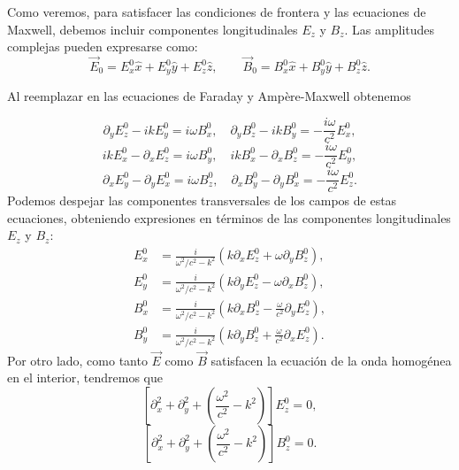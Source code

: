 Como veremos, para satisfacer las condiciones de frontera y las ecuaciones de Maxwell, debemos incluir componentes longitudinales $E_z$ y $B_z$. 
Las amplitudes complejas pueden expresarse como:
\begin{equation}
\vec{E}_0 = E^0_x \hat{x} + E^0_y \hat{y} + E^0_z \hat{z},
\qquad
\vec{B}_0 = B^0_x \hat{x} + B^0_y \hat{y} + B^0_z \hat{z}.
\end{equation}

Al reemplazar en las ecuaciones de Faraday y Ampère-Maxwell obtenemos


\begin{equation}
    \partial_y E^0_z - ik E^0_y = i\omega B^0_x, \quad
    \partial_y B^0_z - ik B^0_y = -\frac{i\omega}{c^2} E^0_x,
\end{equation}
\begin{equation}
    ik E^0_x - \partial_x E^0_z = i\omega B^0_y, \quad
    ik B^0_x - \partial_x B^0_z = -\frac{i\omega}{c^2} E^0_y,
\end{equation}
\begin{equation}
    \partial_x E^0_y - \partial_y E^0_x = i\omega B^0_z, \quad
    \partial_x B^0_y - \partial_y B^0_x = -\frac{i\omega}{c^2} E^0_z.
\end{equation}
Podemos despejar las componentes transversales de los campos de estas ecuaciones, obteniendo expresiones en términos de las componentes longitudinales $E_z$ y $B_z$:
\begin{align}
    E^0_x &= \frac{i}{\omega^2/c^2 - k^2} \left( k \partial_x E^0_z + \omega \partial_y B^0_z \right), \label{ExGO}\\
    E^0_y &= \frac{i}{\omega^2/c^2 - k^2} \left( k \partial_y E^0_z - \omega \partial_x B^0_z \right), \label{EyGO}\\
    B^0_x &= \frac{i}{\omega^2/c^2 - k^2} \left( k \partial_x B^0_z - \frac{\omega}{c^2} \partial_y E^0_z \right), \label{BxGO}\\
    B^0_y &= \frac{i}{\omega^2/c^2 - k^2} \left( k \partial_y B^0_z + \frac{\omega}{c^2} \partial_x E^0_z \right). \label{ByGO}
\end{align}
Por otro lado, como tanto $\vec{E}$ como $\vec{B}$ satisfacen la ecuación de la onda homogénea en el interior, tendremos que
\begin{equation}
\left[ \partial^2_x + \partial^2_y + \left( \frac{\omega^2}{c^2} - k^2 \right) \right] E^0_z = 0,
\end{equation}
\begin{equation}\label{EOBzGO}
\left[ \partial^2_x + \partial^2_y + \left( \frac{\omega^2}{c^2} - k^2 \right) \right] B^0_z = 0.
\end{equation}

